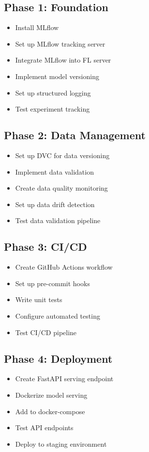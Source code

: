 \documentclass[12pt]{article}
\begin{document}
\subsection{Phase 1: Foundation}
\begin{itemize}
    \item[ ] Install MLflow
    \item[ ] Set up MLflow tracking server
    \item[ ] Integrate MLflow into FL server
    \item[ ] Implement model versioning
    \item[ ] Set up structured logging
    \item[ ] Test experiment tracking
\end{itemize}

\subsection{Phase 2: Data Management}
\begin{itemize}
    \item[ ] Set up DVC for data versioning
    \item[ ] Implement data validation
    \item[ ] Create data quality monitoring
    \item[ ] Set up data drift detection
    \item[ ] Test data validation pipeline
\end{itemize}

\subsection{Phase 3: CI/CD}
\begin{itemize}
    \item[ ] Create GitHub Actions workflow
    \item[ ] Set up pre-commit hooks
    \item[ ] Write unit tests
    \item[ ] Configure automated testing
    \item[ ] Test CI/CD pipeline
\end{itemize}

\subsection{Phase 4: Deployment}
\begin{itemize}
    \item[ ] Create FastAPI serving endpoint
    \item[ ] Dockerize model serving
    \item[ ] Add to docker-compose
    \item[ ] Test API endpoints
    \item[ ] Deploy to staging environment
\end{itemize}
\end{document}
